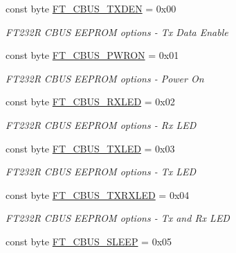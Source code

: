 \begin{DoxyCompactItemize}
\item 
const byte \mbox{\hyperlink{class_f_t_d2_x_x___n_e_t_1_1_f_t_d_i_1_1_f_t___c_b_u_s___o_p_t_i_o_n_s_ae55bfea1c3842fe75bf63a723126e67c}{F\+T\+\_\+\+C\+B\+U\+S\+\_\+\+T\+X\+D\+EN}} = 0x00
\begin{DoxyCompactList}\small\item\em F\+T232R C\+B\+US E\+E\+P\+R\+OM options -\/ Tx Data Enable \end{DoxyCompactList}\item 
const byte \mbox{\hyperlink{class_f_t_d2_x_x___n_e_t_1_1_f_t_d_i_1_1_f_t___c_b_u_s___o_p_t_i_o_n_s_a3fba7067466bc34eda65a1453be2a085}{F\+T\+\_\+\+C\+B\+U\+S\+\_\+\+P\+W\+R\+ON}} = 0x01
\begin{DoxyCompactList}\small\item\em F\+T232R C\+B\+US E\+E\+P\+R\+OM options -\/ Power On \end{DoxyCompactList}\item 
const byte \mbox{\hyperlink{class_f_t_d2_x_x___n_e_t_1_1_f_t_d_i_1_1_f_t___c_b_u_s___o_p_t_i_o_n_s_a5516134c4d6eceaa43d65020dde34ac7}{F\+T\+\_\+\+C\+B\+U\+S\+\_\+\+R\+X\+L\+ED}} = 0x02
\begin{DoxyCompactList}\small\item\em F\+T232R C\+B\+US E\+E\+P\+R\+OM options -\/ Rx L\+ED \end{DoxyCompactList}\item 
const byte \mbox{\hyperlink{class_f_t_d2_x_x___n_e_t_1_1_f_t_d_i_1_1_f_t___c_b_u_s___o_p_t_i_o_n_s_a4feb8b2c25f757db35ac53f5341d62f4}{F\+T\+\_\+\+C\+B\+U\+S\+\_\+\+T\+X\+L\+ED}} = 0x03
\begin{DoxyCompactList}\small\item\em F\+T232R C\+B\+US E\+E\+P\+R\+OM options -\/ Tx L\+ED \end{DoxyCompactList}\item 
const byte \mbox{\hyperlink{class_f_t_d2_x_x___n_e_t_1_1_f_t_d_i_1_1_f_t___c_b_u_s___o_p_t_i_o_n_s_a778080a77e352b8e2cde686bfa1ab21d}{F\+T\+\_\+\+C\+B\+U\+S\+\_\+\+T\+X\+R\+X\+L\+ED}} = 0x04
\begin{DoxyCompactList}\small\item\em F\+T232R C\+B\+US E\+E\+P\+R\+OM options -\/ Tx and Rx L\+ED \end{DoxyCompactList}\item 
const byte \mbox{\hyperlink{class_f_t_d2_x_x___n_e_t_1_1_f_t_d_i_1_1_f_t___c_b_u_s___o_p_t_i_o_n_s_a12ffdb96c52abef0df44530b144b0a80}{F\+T\+\_\+\+C\+B\+U\+S\+\_\+\+S\+L\+E\+EP}} = 0x05

\end{DoxyCompactItemize}
